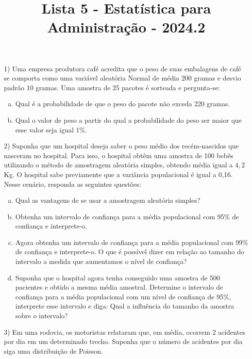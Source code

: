 \documentclass{article}
\title{Lista 5 - Estatística para Administração - 2024.2}
\begin{document}
\date{}
\maketitle

1) Uma empresa produtora café acredita que o peso de suas embalagens de café se comporta como uma variável aleatória Normal de média 200 gramas e desvio padrão 10 gramas. Uma amostra de 25 pacotes é sorteada e pergunta-se:

\begin{enumerate}[a)]
    \item Qual é a probabilidade de que o peso do pacote  não exceda 220 gramas.
    \item Qual o valor de peso a partir do qual a probabilidade do peso ser maior que esse valor seja igual 1\%.

\end{enumerate}

2) Suponha que um hospital deseja saber o peso médio dos recém-nascidos que nasceram no hospital. Para isso, o hospital obtêm uma amostra de 100 bebês utilizando o método de amostragem aleatória simples, obtendo média igual a $4,2$ Kg. O hospital sabe previamente que a variância populacional é igual a 0,16. Nesse cenário, responda as seguintes questões:

\begin{enumerate}[a)]
    \item Qual as vantagens de se usar a amostragem aleatória simples?
    \item Obtenha um intervalo de confiança para a média populacional com 95\% de confiança e interprete-o.
    \item Agora obtenha um intervalo de confiança para a média populacional com 99\% de confiança e interprete-o. O que é possível dizer em relação ao tamanho do intervalo a medida que aumentamos o nível de confiança?
    \item Suponha que o hospital agora tenha conseguido uma amostra de 500 pacientes e obtido a mesma média amostral. Determine o intervalo de confiança para a média populacional com um nível de confiança de 95\%, interprete esse intervalo e diga: Qual a influência do tamanho da amostra sobre o intervalo?
\end{enumerate}

3) Em uma rodovia, os motoristas relataram que, em média, ocorrem 2 acidentes por dia em um determinado trecho. Suponha que o número de acidentes por dia siga uma distribuição de Poisson.


   
    
    
\end{document}
